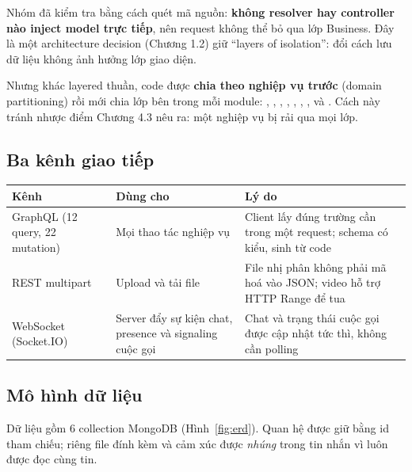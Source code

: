 \documentclass[11pt, a4paper]{article}
\begin{document}
Nhóm đã kiểm tra bằng cách quét mã nguồn: \textbf{không resolver hay controller nào inject model trực tiếp}, nên request không thể bỏ qua lớp Business. Đây là một architecture decision (Chương 1.2) giữ ``layers of isolation'': đổi cách lưu dữ liệu không ảnh hưởng lớp giao diện.

Nhưng khác layered thuần, code được \textbf{chia theo nghiệp vụ trước} (domain partitioning) rồi mới chia lớp bên trong mỗi module: , , , , , , ,  và . Cách này tránh nhược điểm Chương 4.3 nêu ra: một nghiệp vụ bị rải qua mọi lớp.

\subsection{Ba kênh giao tiếp}
\label{sec:channels}
\begin{table}[H]
  \centering
  \small
  \begin{tabularx}{\linewidth}{lYY}
    \toprule
    \textbf{Kênh} & \textbf{Dùng cho} & \textbf{Lý do} \\
    \midrule
    GraphQL  (12 query, 22 mutation) & Mọi thao tác nghiệp vụ & Client lấy đúng trường cần trong một request; schema có kiểu, sinh từ code \\
    REST multipart  & Upload và tải file & File nhị phân không phải mã hoá vào JSON; video hỗ trợ HTTP Range để tua \\
    WebSocket (Socket.IO) & Server đẩy sự kiện chat, presence và signaling cuộc gọi & Chat và trạng thái cuộc gọi được cập nhật tức thì, không cần polling \\
    \bottomrule
  \end{tabularx}
\end{table}

\subsection{Mô hình dữ liệu}
\label{sec:data}

Dữ liệu gồm 6 collection MongoDB (Hình~\ref{fig:erd}). Quan hệ được giữ bằng id tham chiếu; riêng file đính kèm và cảm xúc được \emph{nhúng} trong tin nhắn vì luôn được đọc cùng tin.
\end{document}
